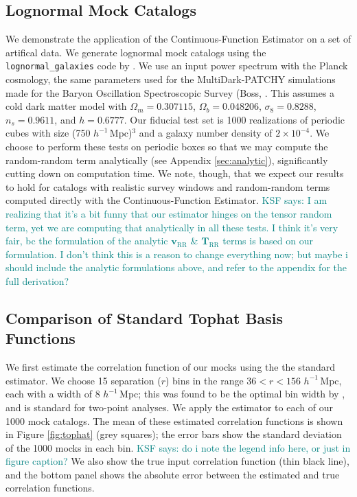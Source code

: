 \documentclass[modern]{aastex62}
\newcommand{\est}{the Continuous-Function Estimator\xspace}
\newcommand{\hmpc}{$h^{-1}\,$Mpc}
\newcommand{\bld}[1]{\bm{#1}} %
\newcommand{\vv}[1]{\bld{v}_\mathrm{#1}}
\newcommand{\TT}[1]{\bld{T}_\mathrm{#1}}
\newcommand{\KSF}[1]{\textcolor{teal}{KSF says: #1}}
\begin{document}
\subsection{Lognormal Mock Catalogs}

We demonstrate the application of \est on a set of artifical data.
We generate lognormal mock catalogs \citep{ColesJones1991} using the \texttt{lognormal\_galaxies} code by \citep{Agrawal2017}.
We use an input power spectrum with the Planck cosmology, the same parameters used for the MultiDark-PATCHY simulations \citep{Kitaura2016} made for the Baryon Oscillation Spectroscopic Survey (Boss, \citealt{Dawson2013}.
This assumes a cold dark matter model with $\Omega_m = 0.307115$, $\Omega_b = 0.048206$, $\sigma_8 = 0.8288$, $n_s = 0.9611$, and $h = 0.6777$.
Our fiducial test set is 1000 realizations of periodic cubes with size (750 \hmpc)$^3$ and a galaxy number density of $2 \times 10^{-4}$.
We choose to perform these tests on periodic boxes so that we may compute the random-random term analytically (see Appendix \ref{sec:analytic}), significantly cutting down on computation time.
We note, though, that we expect our results to hold for catalogs with realistic survey windows and random-random terms computed directly with \est.
\KSF{I am realizing that it's a bit funny that our estimator hinges on the tensor random term, yet we are computing that analytically in all these tests. I think it's very fair, bc the formulation of the analytic $\vv{RR}$ \& $\TT{RR}$ terms is based on our formulation. I don't think this is a reason to change everything now; but maybe i should include the analytic formulations above, and refer to the appendix for the full derivation?}

\subsection{Comparison of Standard Tophat Basis Functions}

We first estimate the correlation function of our mocks using the the standard estimator.
We choose 15 separation ($r$) bins in the range $36 < r < 156$ \hmpc, each with a width of 8 \hmpc; this was found to be the optimal bin width by \cite{Percival2014}, and is standard for two-point analyses.
We apply the estimator to each of our 1000 mock catalogs.
The mean of these estimated correlation functions is shown in Figure \ref{fig:tophat} (grey squares); the error bars show the standard deviation of the 1000 mocks in each bin.
\KSF{do i note the legend info here, or just in figure caption?}
We also show the true input correlation function (thin black line), and the bottom panel shows the absolute error between the estimated and true correlation functions.
\end{document}
